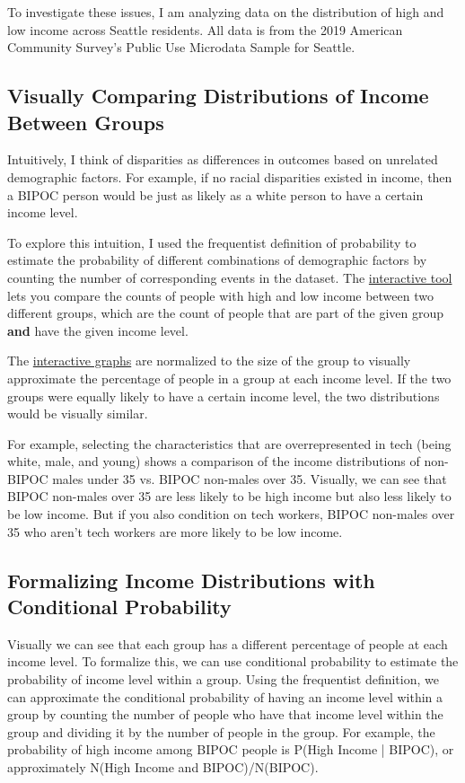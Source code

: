 \documentclass[11pt]{article}
\begin{document}
To investigate these issues, I am analyzing data on the distribution of high and low income across Seattle residents. All data is from the 2019 American Community Survey's Public Use Microdata Sample for Seattle.\cite{acs}\cite{pums} 

\subsection*{Visually Comparing Distributions of Income Between Groups}

Intuitively, I think of disparities as differences in outcomes based on unrelated demographic factors. For example, if no racial disparities existed in income, then a BIPOC person would be just as likely as a white person to have a certain income level.

To explore this intuition, I used the frequentist definition of probability\cite{piech:prob} to estimate the probability of different combinations of demographic factors by counting the number of corresponding events in the dataset. The \href{https://observablehq.com/d/b1dfcf5fca53a8b2#cell-1196}{interactive tool} lets you compare the counts of people with high and low income between two different groups, which are the count of people that are part of the given group \textbf{and} have the given income level.\cite{piech:and}

The \href{https://observablehq.com/d/b1dfcf5fca53a8b2#cell-1196}{interactive graphs} are normalized to the size of the group to visually approximate the percentage of people in a group at each income level. If the two groups were equally likely to have a certain income level, the two distributions would be visually similar.

For example, selecting the characteristics that are overrepresented in tech (being white, male, and young) shows a comparison of the income distributions of non-BIPOC males under 35 vs. BIPOC non-males over 35.  Visually, we can see that BIPOC non-males over 35 are less likely to be high income but also less likely to be low income. But if you also condition on tech workers, BIPOC non-males over 35 who aren't tech workers are more likely to be low income.

\subsection*{Formalizing Income Distributions with Conditional Probability}

Visually we can see that each group has a different percentage of people at each income level. To formalize this, we can use conditional probability\cite{piech:cond} to estimate the probability of income level within a group. Using the frequentist definition, we can approximate the conditional probability of having an income level within a group by counting the number of people who have that income level within the group and dividing it by the number of people in the group. For example, the probability of high income among BIPOC people is P(High Income | BIPOC), or approximately N(High Income and BIPOC)/N(BIPOC).
\end{document}
